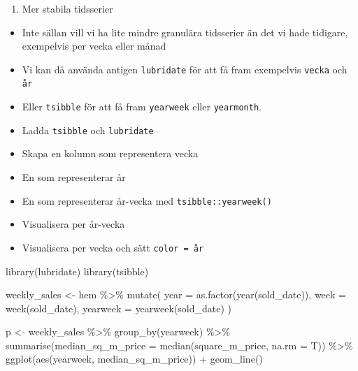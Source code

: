 \documentclass[
]{book}
\newenvironment{Shaded}{\begin{snugshade}}{\end{snugshade}}
\newcommand{\AttributeTok}[1]{\textcolor[rgb]{0.77,0.63,0.00}{#1}}
\newcommand{\FunctionTok}[1]{\textcolor[rgb]{0.00,0.00,0.00}{#1}}
\newcommand{\NormalTok}[1]{#1}
\newcommand{\OtherTok}[1]{\textcolor[rgb]{0.56,0.35,0.01}{#1}}
\newcommand{\SpecialCharTok}[1]{\textcolor[rgb]{0.00,0.00,0.00}{#1}}
\providecommand{\tightlist}{%
  \setlength{\itemsep}{0pt}\setlength{\parskip}{0pt}}
\begin{document}
\begin{enumerate}
\def\labelenumi{\arabic{enumi}.}
\setcounter{enumi}{1}
\tightlist
\item
  Mer stabila tidsserier
\end{enumerate}

\begin{itemize}
\item
  Inte sällan vill vi ha lite mindre granulära tidsserier än det vi hade tidigare, exempelvis per vecka eller månad
\item
  Vi kan då använda antigen \texttt{lubridate} för att få fram exempelvis \texttt{vecka} och \texttt{år}
\item
  Eller \texttt{tsibble} för att få fram \texttt{yearweek} eller \texttt{yearmonth}.
\item
  Ladda \texttt{tsibble} och \texttt{lubridate}
\item
  Skapa en kolumn som representera vecka
\item
  En som representerar år
\item
  En som representerar år-vecka med \texttt{tsibble::yearweek()}
\item
  Visualisera per år-vecka
\item
  Visualisera per vecka och sätt \texttt{color\ =\ år}
\end{itemize}

\begin{Shaded}
\begin{Highlighting}[]
\FunctionTok{library}\NormalTok{(lubridate)}
\FunctionTok{library}\NormalTok{(tsibble)}

\NormalTok{weekly\_sales }\OtherTok{\textless{}{-}}\NormalTok{ hem }\SpecialCharTok{\%\textgreater{}\%} 
  \FunctionTok{mutate}\NormalTok{(}
    \AttributeTok{year =} \FunctionTok{as.factor}\NormalTok{(}\FunctionTok{year}\NormalTok{(sold\_date)),}
    \AttributeTok{week =} \FunctionTok{week}\NormalTok{(sold\_date),}
    \AttributeTok{yearweek =} \FunctionTok{yearweek}\NormalTok{(sold\_date)}
\NormalTok{  )}

\NormalTok{p }\OtherTok{\textless{}{-}}\NormalTok{ weekly\_sales }\SpecialCharTok{\%\textgreater{}\%} 
  \FunctionTok{group\_by}\NormalTok{(yearweek) }\SpecialCharTok{\%\textgreater{}\%} 
  \FunctionTok{summarise}\NormalTok{(}\AttributeTok{median\_sq\_m\_price =} \FunctionTok{median}\NormalTok{(square\_m\_price, }\AttributeTok{na.rm =}\NormalTok{ T)) }\SpecialCharTok{\%\textgreater{}\%} 
  \FunctionTok{ggplot}\NormalTok{(}\FunctionTok{aes}\NormalTok{(yearweek, median\_sq\_m\_price)) }\SpecialCharTok{+}
  \FunctionTok{geom\_line}\NormalTok{() }
\end{Highlighting}
\end{Shaded}
\end{document}
